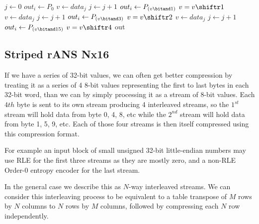 \documentclass[a4paper]{article}
\begin{document}
\begin{algorithmic}[1]
  \State $j \gets 0$ 
   
      \State $out_i \gets P_0$
    \EndFor
  \Statex
   
        \State $v \gets data_j$
        \State $j \gets j+1$
      \EndIf
      \State $out_i \gets P_{(v \bitand 1)}$
      \State $v = v \shiftr 1$
    \EndFor
  \Statex
   
        \State $v \gets data_j$
        \State $j \gets j+1$
      \EndIf
      \State $out_i \gets P_{(v \bitand 3)}$
      \State $v = v \shiftr 2$
    \EndFor
  \Statex
   
        \State $v \gets data_j$
        \State $j \gets j+1$
      \EndIf
      \State $out_i \gets P_{(v \bitand 15)}$
      \State $v = v \shiftr 4$
    \EndFor
  \Statex
  \Else
    \State {}
  \EndIf
  \Statex
  \State \Return out
\EndFunction
\end{algorithmic}


\subsection{Striped rANS Nx16}
\label{sec:ransstripe}

If we have a series of 32-bit values, we can often get better compression by
treating it as a series of 4 8-bit values representing the first to
last bytes in each 32-bit word, than we can by simply processing it as
a stream of 8-bit values.
Each $4{th}$ byte is sent to its own stream producing 4 interleaved streams, so the $1^{st}$ stream will hold data from byte 0, 4, 8, etc while the $2^{nd}$ stream will hold data from byte 1, 5, 9, etc.
Each of those four streams is then itself compressed using this compression format.

For example an input block of small unsigned 32-bit little-endian numbers may use RLE for the first three streams as they are mostly zero, and a non-RLE Order-0 entropy encoder for the last stream.

In the general case we describe this as $N$-way interleaved streams.
We can consider this interleaving process to be equivalent to a table
transpose of $M$ rows by $N$ columns to $N$ rows by $M$ columns,
followed by compressing each $N$ row independently.
\end{document}
